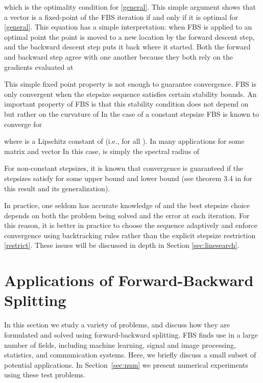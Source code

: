 \documentclass{amsart}
\newcommand{\eqn}[2]{}
\theoremstyle{definition}
\begin{document}
    which is the optimality condition for \eqref{general}.  This simple argument shows that a vector is a fixed-point of the FBS iteration if and only if it is optimal for \eqref{general}.  This equation has a simple interpretation:  when FBS is applied to an optimal point  the point is moved to a new location by the forward descent step, and the backward descent step puts it back where it started.  Both the forward and backward step agree with one another because they both rely on the gradients evaluated at  
    
    This simple fixed point property is not enough to guarantee convergence.  FBS is only convergent when the stepsize sequence  satisfies certain stability bounds.  An important property of FBS is that this stability condition does not depend on  but rather on the curvature of       
     In the case of a constant stepsize  FBS is known to converge for 
    \eqn{restrict}{\tau < \frac{2}{L(\nabla f)}}
    where  is a Lipschitz constant of   (i.e.,  for all ).   In many applications  for some matrix  and vector   In this case,  is simply the spectral radius of 
    
        For non-constant stepsizes, it is known that convergence is guaranteed if the stepsizes satisfy  for some upper bound  and  lower bound   (see theorem 3.4 in \cite{CW05} for this result and its generalization).
    
    In practice, one seldom has accurate knowledge of  and the best stepsize choice depends on both the problem being solved and the error at each iteration.  For this reason, it is better in practice to choose the sequence  adaptively and enforce convergence using backtracking rules rather than the explicit stepsize restriction \eqref{restrict}.  These issues will be discussed in depth in Section \ref{sec:linesearch}.
    
  





\section{Applications of Forward-Backward Splitting} \label{sec:apps}
In this section we study a variety of problems, and discuss how they are formulated and solved using forward-backward splitting.
FBS  finds use in a large number of fields, including machine learning, signal and image processing, statistics, and communication systems.  Here, we briefly discuss a small subset of potential applications.  In Section~\ref{sec:num} we present numerical experiments using these test problems.
\end{document}
